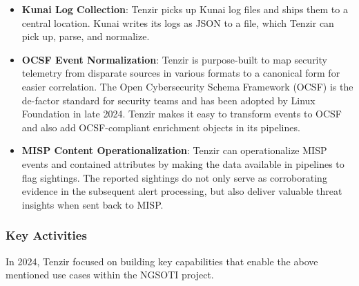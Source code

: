 \begin{itemize}
\item \textbf{Kunai Log Collection}: Tenzir picks up Kunai log files and ships
	them to a central location. Kunai writes its logs as JSON to a file,
	which Tenzir can pick up, parse, and normalize.
\item \textbf{OCSF Event Normalization}: Tenzir is purpose-built to map security
	telemetry from disparate sources in various formats to a canonical form
	for easier correlation. The Open Cybersecurity Schema Framework (OCSF)
	is the de-factor standard for security teams and has been adopted by
	Linux Foundation in late 2024. Tenzir makes it easy to transform events
	to OCSF and also add OCSF-compliant enrichment objects in its pipelines.
\item \textbf{MISP Content Operationalization}: Tenzir can operationalize MISP
	events and contained attributes by making the data available in
	pipelines to flag sightings. The reported sightings do not only serve as
	corroborating evidence in the subsequent alert processing, but also
	deliver valuable threat insights when sent back to MISP.
\end{itemize}

\subsubsection{Key Activities}

In 2024, Tenzir focused on building key capabilities that enable the above
mentioned use cases within the NGSOTI project.


